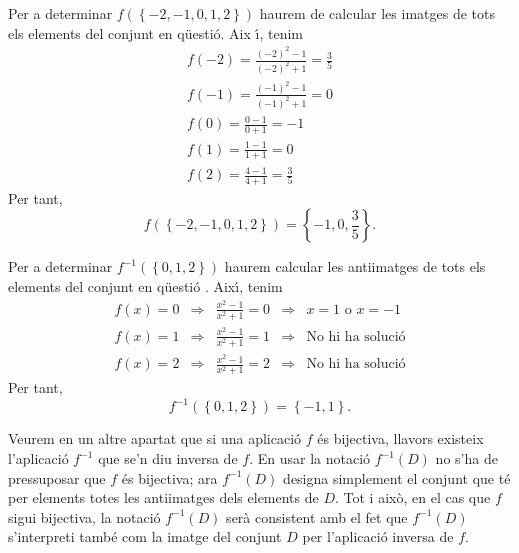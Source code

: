 \begin{solucio}
Per a determinar $f\left( \left\{ -2,-1,0,1,2\right\} \right) $ haurem de
calcular les imatges de tots els elements del conjunt en q\"{u}esti\'{o}. Aix%
\'{\i}, tenim%
\begin{equation*}
\begin{array}{c}
f(-2)=\frac{(-2)^{2}-1}{(-2)^{2}+1}=\frac{3}{5} \\
f(-1)=\frac{(-1)^{2}-1}{(-1)^{2}+1}=0 \\
f(0)=\frac{0-1}{0+1}=-1 \\
f(1)=\frac{1-1}{1+1}=0 \\
f(2)=\frac{4-1}{4+1}=\frac{3}{5}%
\end{array}
\end{equation*}
Per tant,%
\begin{equation*}
f\left( \left\{ -2,-1,0,1,2\right\} \right) =\left\{ -1,0,\frac{3}{5}%
\right\} \text{.}
\end{equation*}

Per a determinar $f^{-1}\left( \left\{ 0,1,2\right\} \right) $ haurem
calcular les antiimatges de tots els elements del conjunt en q\"{u}esti\'{o}%
. Aix\'{\i}, tenim%
\begin{equation*}
\begin{array}{ccccc}
f(x)=0 & \Longrightarrow & \frac{x^{2}-1}{x^{2}+1}=0 & \Longrightarrow & x=1%
\text{ o }x=-1 \\
f(x)=1 & \Longrightarrow & \frac{x^{2}-1}{x^{2}+1}=1 & \Longrightarrow &
\text{No hi ha soluci\'{o}} \\
f(x)=2 & \Longrightarrow & \frac{x^{2}-1}{x^{2}+1}=2 & \Longrightarrow &
\text{No hi ha soluci\'{o}}%
\end{array}
\end{equation*}
Per tant,%
\begin{equation*}
f^{-1}\left( \left\{ 0,1,2\right\} \right) =\left\{ -1,1\right\} \text{.}
\end{equation*}
\end{solucio}

\begin{observacio}
Veurem en un altre apartat que si una aplicaci\'{o} $f$ \'{e}s bijectiva,
llavors existeix l'aplicaci\'{o} $f^{-1}$ que se'n diu inversa de $f$. En
usar la notaci\'{o} $f^{-1}(D)$ no s'ha de pressuposar que $f$ \'{e}s
bijectiva; ara $f^{-1}(D)$ designa simplement el conjunt que t\'{e} per
elements totes les antiimatges dels elements de $D$. Tot i aix\`{o}, en el
cas que $f$ sigui bijectiva, la notaci\'{o} $f^{-1}(D)$ ser\`{a} consistent
amb el fet que $f^{-1}(D)$ s'interpreti tamb\'{e} com la imatge del conjunt $%
D$ per l'aplicaci\'{o} inversa de $f$.
\end{observacio}

